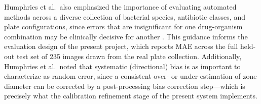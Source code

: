 Humphries et al.\ also emphasized the importance of evaluating automated methods across a
diverse collection of bacterial species, antibiotic classes, and plate configurations, since
errors that are insignificant for one drug-organism combination may be clinically decisive
for another \cite{humphries2018}. This guidance informs the evaluation design of the present
project, which reports MAE across the full held-out test set of 235 images drawn from the
real plate collection. Additionally, Humphries et al.\ noted that systematic (directional)
bias is as important to characterize as random error, since a consistent over- or under-estimation
of zone diameter can be corrected by a post-processing bias correction step---which is precisely
what the calibration refinement stage of the present system implements.
